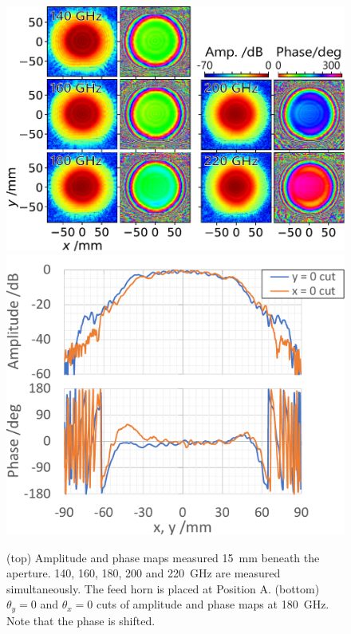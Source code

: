 \documentclass[journal]{IEEEtran}
\begin{document}
\begin{figure}[!t]
\centering
\includegraphics[width=\linewidth]{Figures/NF_f1_Vpol.pdf}
\hfil
\includegraphics[width=0.8\linewidth]{Figures/NF_f1_Vpol_cut.pdf}
\caption{%
(top) Amplitude and phase maps measured 15~mm beneath the aperture. 140, 160, 180, 200 and 220~GHz are measured simultaneously. The feed horn is placed at Position A.
(bottom) $\theta_y = 0$ and $\theta_x = 0$ cuts of amplitude and phase maps at 180~GHz. Note that the phase is shifted. 
}
\label{fig:NF_f1_Vpol}
\end{figure}
%
%
\end{document}
